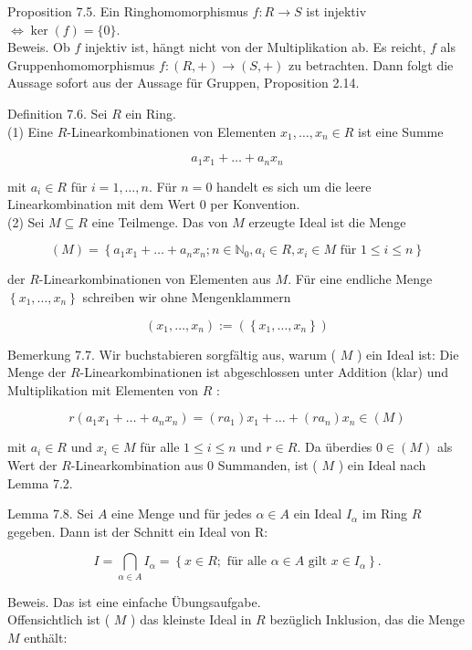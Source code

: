 \documentclass[10pt, letterpaper]{article}
\begin{document}
Proposition 7.5. Ein Ringhomomorphismus $f: R \rightarrow S$ ist injektiv $\Longleftrightarrow \operatorname{ker}(f)=\{0\}$.\\
Beweis. Ob $f$ injektiv ist, hängt nicht von der Multiplikation ab. Es reicht, $f$ als Gruppenhomomorphismus $f:(R,+) \rightarrow(S,+)$ zu betrachten. Dann folgt die Aussage sofort aus der Aussage für Gruppen, Proposition 2.14.

Definition 7.6. Sei $R$ ein Ring.\\
(1) Eine $R$-Linearkombinationen von Elementen $x_{1}, \ldots, x_{n} \in R$ ist eine Summe

$$
a_{1} x_{1}+\ldots+a_{n} x_{n}
$$

mit $a_{i} \in R$ für $i=1, \ldots, n$. Für $n=0$ handelt es sich um die leere Linearkombination mit dem Wert 0 per Konvention.\\
(2) Sei $M \subseteq R$ eine Teilmenge. Das von $M$ erzeugte Ideal ist die Menge

$$
(M)=\left\{a_{1} x_{1}+\ldots+a_{n} x_{n} ; n \in \mathbb{N}_{0}, a_{i} \in R, x_{i} \in M \text { für } 1 \leq i \leq n\right\}
$$

der $R$-Linearkombinationen von Elementen aus $M$. Für eine endliche Menge $\left\{x_{1}, \ldots, x_{n}\right\}$ schreiben wir ohne Mengenklammern

$$
\left(x_{1}, \ldots, x_{n}\right):=\left(\left\{x_{1}, \ldots, x_{n}\right\}\right)
$$

Bemerkung 7.7. Wir buchstabieren sorgfältig aus, warum ( $M$ ) ein Ideal ist: Die Menge der $R$-Linearkombinationen ist abgeschlossen unter Addition (klar) und Multiplikation mit Elementen von $R$ :

$$
r\left(a_{1} x_{1}+\ldots+a_{n} x_{n}\right)=\left(r a_{1}\right) x_{1}+\ldots+\left(r a_{n}\right) x_{n} \in(M)
$$

mit $a_{i} \in R$ und $x_{i} \in M$ für alle $1 \leq i \leq n$ und $r \in R$. Da überdies $0 \in(M)$ als Wert der $R$-Linearkombination aus 0 Summanden, ist ( $M$ ) ein Ideal nach Lemma 7.2.

Lemma 7.8. Sei $A$ eine Menge und für jedes $\alpha \in A$ ein Ideal $I_{\alpha}$ im Ring $R$ gegeben. Dann ist der Schnitt ein Ideal von R:

$$
I=\bigcap_{\alpha \in A} I_{\alpha}=\left\{x \in R ; \text { für alle } \alpha \in A \text { gilt } x \in I_{\alpha}\right\} .
$$

Beweis. Das ist eine einfache Übungsaufgabe.\\
Offensichtlich ist ( $M$ ) das kleinste Ideal in $R$ bezüglich Inklusion, das die Menge $M$ enthält:
\end{document}
